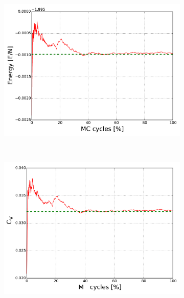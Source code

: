 \begin{figure}[H]
    \centering
    \begin{subfigure}{0.5\textwidth}
        \centering
        \includegraphics[width=\linewidth]{result/bilder/2x2/energy22}
        \caption{}
    \end{subfigure}%
    ~ 
    \begin{subfigure}{0.5\textwidth}
    	\centering
    	\includegraphics[width=\linewidth]{result/bilder/2x2/cv22_}
    	\caption{}
    \end{subfigure}
    \begin{subfigure}{0.5\textwidth}
        \centering

\end{subfigure}
\end{figure}
